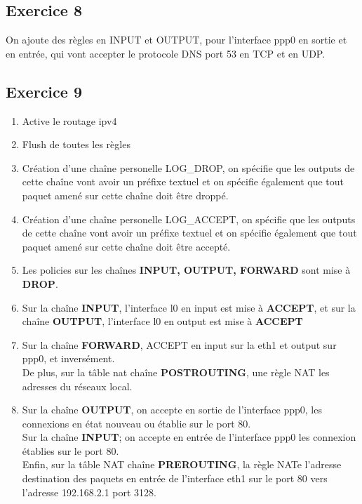 \documentclass[a4paper,10pt,final,fleqn]{article}
\begin{document}
		\subsection{Exercice 8}

			On ajoute des règles en INPUT et OUTPUT, pour l'interface ppp0 en sortie et en entrée, qui vont accepter le protocole DNS port 53 en TCP et en UDP.\\

		\subsection{Exercice 9}

			\begin{enumerate}
				\item Active le routage ipv4
				\item Flush de toutes les règles
				\item Création d'une chaîne personelle LOG\_DROP, on spécifie que les outputs de cette chaîne vont avoir un préfixe textuel et on spécifie également que tout paquet amené sur cette chaîne doit être droppé.
				\item Création d'une chaîne personelle LOG\_ACCEPT, on spécifie que les outputs de cette chaîne vont avoir un préfixe textuel et on spécifie également que tout paquet amené sur cette chaîne doit être accepté.
				\item Les policies sur les chaînes \textbf{INPUT, OUTPUT, FORWARD} sont mise à \textbf{DROP}.
				\item Sur la chaîne \textbf{INPUT}, l'interface l0 en input est mise à \textbf{ACCEPT}, et sur la chaîne \textbf{OUTPUT}, l'interface l0 en output est mise à \textbf{ACCEPT}
				\item Sur la chaîne \textbf{FORWARD}, ACCEPT en input sur la eth1 et output sur ppp0, et inversément.\\
				De plus, sur la tâble nat chaîne \textbf{POSTROUTING}, une règle NAT les adresses du réseaux local.\\
				\item Sur la chaîne \textbf{OUTPUT}, on accepte en sortie de l'interface ppp0, les connexions en état nouveau ou établie sur le port 80.\\
				Sur la chaîne \textbf{INPUT}; on accepte en entrée de l'interface ppp0 les connexion établies sur le port 80.\\
				Enfin, sur la tâble NAT chaîne \textbf{PREROUTING}, la règle NATe l'adresse destination des paquets en entrée de l'interface eth1 sur le port 80 vers l'adresse 192.168.2.1 port 3128.\\

\end{enumerate}
\end{document}
